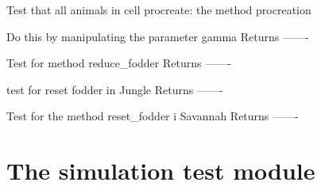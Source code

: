 \documentclass[a4paper,10pt,english]{sphinxmanual}
\begin{document}
\begin{fulllineitems}
\begin{fulllineitems}
\end{fulllineitems}


\begin{fulllineitems}
\label{\detokenize{tests:biosim.tests.test_landscape.TestLandscape.test_procreation}}
Test that all animals in cell procreate: the method procreation

Do this by manipulating the parameter gamma
Returns
-------

\end{fulllineitems}


\begin{fulllineitems}
\label{\detokenize{tests:biosim.tests.test_landscape.TestLandscape.test_reduce_fodder}}
Test for method reduce\_fodder
Returns
-------

\end{fulllineitems}


\begin{fulllineitems}
\label{\detokenize{tests:biosim.tests.test_landscape.TestLandscape.test_reset_fodder_jungle}}
test for reset fodder in Jungle
Returns
-------

\end{fulllineitems}


\begin{fulllineitems}
\label{\detokenize{tests:biosim.tests.test_landscape.TestLandscape.test_reset_fodder_savannah}}
Test for the method reset\_fodder i Savannah
Returns
-------

\end{fulllineitems}


\end{fulllineitems}



\section{The simulation test module}
\label{\detokenize{tests:the-simulation-test-module}}\label{\detokenize{tests:module-biosim.tests.test_simulation}}
\end{document}
